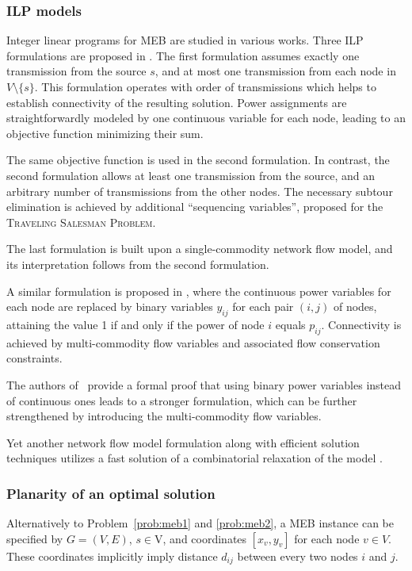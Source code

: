 \subsubsection{ILP models}

Integer linear programs for MEB are studied in various works.
Three ILP formulations are proposed in \cite{das03}.
The first formulation assumes exactly one transmission from the source $s$, and at most one transmission from each node in $V\setminus\{s\}$.
This formulation operates with order of transmissions which helps to establish connectivity of the resulting solution.
Power assignments are straightforwardly modeled by one continuous variable for each node, leading to an objective function minimizing their sum.

The same objective function is used in the second formulation.
In contrast, the second formulation allows at least one transmission from the source, and an arbitrary number of transmissions from the other nodes.
The necessary subtour elimination is achieved by additional ``sequencing variables'', proposed for the \textsc{Traveling Salesman Problem}.

The last formulation is built upon a single-commodity network flow model, and its interpretation follows from the second formulation.

A similar formulation is proposed in \cite{yuan05}, where the continuous power variables for each node are replaced by binary variables $y_{ij}$ for each pair $(i,j)$ of nodes,
attaining the value 1 if and only if the power of node $i$ equals $p_{ij}$.
Connectivity is achieved by multi-commodity flow variables and associated flow conservation constraints.

The authors of~\cite{haugland11} provide a formal proof that using binary power variables instead of continuous ones leads to a stronger formulation,
which can be further strengthened by introducing the multi-commodity flow variables.

Yet another network flow model formulation along with efficient solution techniques utilizes a fast solution of a combinatorial relaxation of the model \cite{min06}.

\subsubsection{Planarity of an optimal solution}
Alternatively to Problem~\ref{prob:meb1} and \ref{prob:meb2}, a MEB instance can be specified by $G=(V,E)$, $s\in $V, and coordinates $\left[x_v,y_v\right]$ for each node $v\in V$.
These coordinates implicitly imply distance $d_{ij}$ between every two nodes $i$ and $j$.

